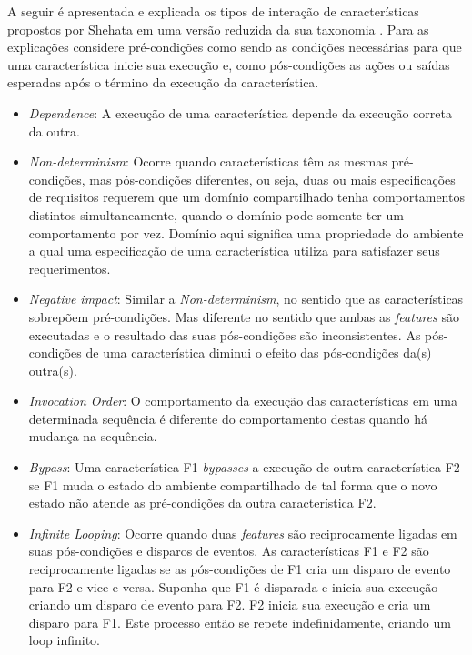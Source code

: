 A seguir é apresentada e explicada os tipos de interação de características propostos por Shehata em uma versão reduzida da sua taxonomia \cite{NHLABATSI:2008}. Para as explicações considere pré-condições como sendo as condições necessárias para que uma característica inicie sua execução e, como pós-condições as ações ou saídas esperadas após o término da execução da característica.

\begin{itemize}
\item \textit{Dependence}: A execução de uma característica depende da execução correta da outra.
\item \textit{Non-determinism}: Ocorre quando características têm as mesmas pré-condições, mas pós-condições diferentes, ou seja, duas ou mais especificações de requisitos requerem que um domínio compartilhado tenha comportamentos distintos simultaneamente, quando o domínio pode somente ter um comportamento por vez. Domínio aqui significa uma propriedade do ambiente a qual uma especificação de uma característica utiliza para satisfazer seus requerimentos. 
\item \textit{Negative impact}: Similar a \textit{Non-determinism}, no sentido que as características sobrepõem pré-condições. Mas diferente no sentido que ambas as \textit{features} são executadas e o resultado das suas pós-condições são inconsistentes. As pós-condições de uma característica diminui o efeito das pós-condições da(s) outra(s).
\item \textit{Invocation Order}: O comportamento da execução das características em uma determinada sequência é diferente do comportamento destas quando há mudança na sequência.
\item \textit{Bypass}: Uma característica F1 \textit{bypasses} a execução de outra característica F2 se F1 muda o estado do ambiente compartilhado de tal forma que o novo estado não atende as pré-condições da outra característica F2.
\item \textit{Infinite Looping}: Ocorre quando duas \textit{features} são reciprocamente ligadas em suas pós-condições e disparos de eventos. As características F1 e F2 são reciprocamente ligadas se as pós-condições de F1 cria um disparo de evento para F2 e vice e versa. Suponha que F1 é disparada e inicia sua execução criando um disparo de evento para F2. F2 inicia sua execução e cria um disparo para F1. Este processo então se repete indefinidamente, criando um loop infinito.  
\end{itemize}

